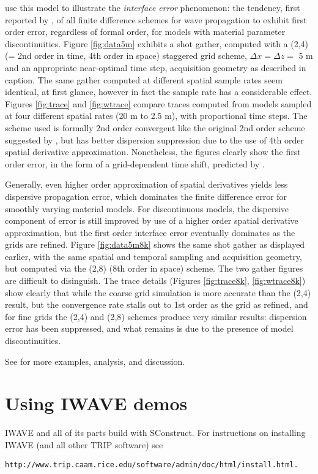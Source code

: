 \cite{SymesVdovina:09} use this model to illustrate the {\em
  interface error} phenomenon: the tendency, first reported by
\cite{Brown:84}, of all finite difference schemes for wave
propagation to exhibit first order error, regardless of formal order,
for models with material parameter discontinuities. 
Figure \ref{fig:data5m} exhibits a shot gather, computed with a (2,4) (= 2nd order in time,
4th order in space) staggered grid scheme, $\Delta
x = \Delta z = $ 5 m and an appropriate near-optimal time step, acquisition geometry as described in
caption. The same gather computed at different spatial sample rates
seem identical, at first glance, however in fact the sample rate has a considerable effect. Figures
\ref{fig:trace} and \ref{fig:wtrace} compare traces computed from models sampled
at four different spatial rates (20 m to 2.5 m), with proportional
time steps. The scheme used is formally 2nd order
convergent like the original 2nd order scheme suggested by
\cite{Vir:84}, but has better dispersion suppression due to the use of
4th order spatial derivative approximation. Nonetheless,
the figures clearly show the first order error, in the form of a
grid-dependent time shift, predicted by \cite{Brown:84}. 

Generally, even higher order approximation of spatial derivatives
yields less dispersive propagation error, which dominates the finite
difference error for smoothly varying material models. For
discontinuous models, the dispersive component of error is still
improved by use of a higher order spatial derivative approximation,
but the first order interface error eventually dominates as the grids
are refined. Figure \ref{fig:data5m8k} shows the same shot gather as
displayed earlier, with the same spatial and temporal sampling and
acquisition geometry, but computed via the (2,8) (8th order in space)
scheme. The two gather figures are difficult to disinguish. The trace
details (Figures \ref{fig:trace8k}, \ref{fig:wtrace8k}) show clearly
that while the coarse grid simulation is more accurate than the (2,4)
result, but the convergence rate stalls out to 1st order as the grid
as refined, and for fine grids the (2,4) and (2,8) schemes produce
very similar results: dispersion error has been suppressed, and what
remains is due to the presence of model discontinuities.

See
\cite[]{SymesVdovina:09} for more examples, analysis, and discussion.

\section{Using IWAVE demos}
IWAVE and all of its parts build with SConstruct. For instructions on
installing IWAVE (and all other TRIP software) see 
\begin{verbatim}
http://www.trip.caam.rice.edu/software/admin/doc/html/install.html.
\end{verbatim}

